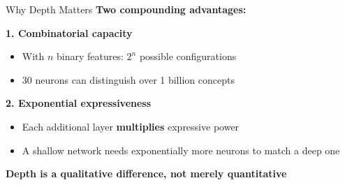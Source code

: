 \begin{frame}{Why Depth Matters}
    \textbf{Two compounding advantages:}
    
    \vspace{1em}
    \textbf{1. Combinatorial capacity}
    \begin{itemize}
        \item With $n$ binary features: $2^n$ possible configurations
        \item 30 neurons can distinguish over 1 billion concepts
    \end{itemize}
    
    \vspace{1em}
    \textbf{2. Exponential expressiveness}
    \begin{itemize}
        \item Each additional layer \textbf{multiplies} expressive power
        \item A shallow network needs exponentially more neurons to match a deep one
    \end{itemize}
    
    \vspace{1em}
    \textbf{Depth is a qualitative difference, not merely quantitative}
\end{frame}
